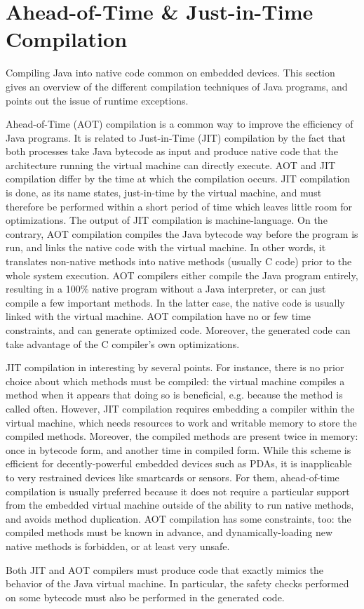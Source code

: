 \section{Ahead-of-Time \& Just-in-Time Compilation}%
\label{sec:sota}

Compiling Java into native code common on embedded devices. This section gives an overview of the different compilation techniques of Java programs,
 and points out the issue of runtime exceptions. %


Ahead-of-Time (AOT) compilation is a common way to improve the efficiency of Java programs. It is related to Just-in-Time (JIT) compilation by the fact that both processes take Java bytecode as input and produce native code that the architecture running the virtual machine can directly execute. AOT and JIT compilation differ by the time at which the compilation occurs. JIT compilation is done, as its name states, just-in-time by the virtual machine, and must therefore be performed within a short period of time which leaves little room for optimizations. The output of JIT compilation is machine-language. On the contrary, AOT compilation compiles the Java bytecode way before the program is run, and links the native code with the virtual machine. In other words, it translates non-native methods into native methods (usually C code) prior to the whole system execution. AOT compilers either compile the Java program entirely, resulting in a 100\% native program without a Java interpreter, or can just compile a few important methods. In the latter case, the native code is usually linked with the virtual machine. AOT compilation have no or few time constraints, and can generate optimized code. Moreover, the generated code can take advantage of the C compiler's own optimizations.

JIT compilation in interesting by several points. For instance, there is no prior choice about which methods must be compiled: the virtual machine compiles a method when it appears that doing so is beneficial, e.g. because the method is called often. However, JIT compilation requires embedding a compiler within the virtual machine, which needs resources to work and writable memory to store the compiled methods. Moreover, the compiled methods are present twice in memory: once in bytecode form, and another time in compiled form. While this scheme is efficient for decently-powerful embedded devices such as PDAs, it is inapplicable to very restrained devices like smartcards or sensors. For them, ahead-of-time compilation is usually preferred because it does not require a particular support from the embedded virtual machine outside of the ability to run native methods, and avoids method duplication. AOT compilation has some constraints, too: the compiled methods must be known in advance, and dynamically-loading new native methods is forbidden, or at least very unsafe.

Both JIT and AOT compilers must produce code that exactly mimics the behavior of the Java virtual machine. In particular, the safety checks performed on some bytecode must also be performed in the generated code.
